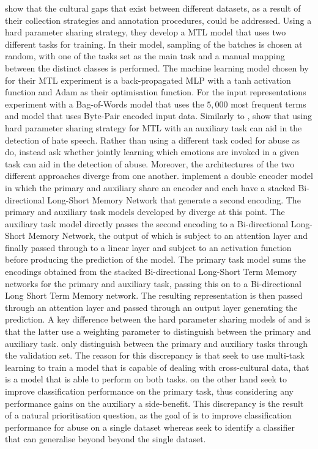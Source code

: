 \citet{Waseem:2018} show that the cultural gaps that exist between different datasets, as a result of their collection strategies and annotation procedures, could be addressed.
Using a hard parameter sharing strategy, they develop a MTL model that uses two different tasks for training.
In their model, sampling of the batches is chosen at random, with one of the tasks set as the main task and a manual mapping between the distinct classes is performed.
The machine learning model chosen by \citet{Waseem:2018} for their MTL experiment is a back-propagated MLP with a tanh activation function and Adam as their optimisation function.
For the input representations \citet{Waseem:2018} experiment with a Bag-of-Words model that uses the $5,000$ most frequent terms and model that uses Byte-Pair encoded input data.
Similarly to \citet{Waseem:2018}, \citet{Rajamanickam:2020} show that using hard parameter sharing strategy for MTL with an auxiliary task can aid in the detection of hate speech.
Rather than using a different task coded for abuse as \citet{Waseem:2018} do, \citet{Rajamanickam:2020} instead ask whether jointly learning which emotions are invoked in a given task can aid in the detection of abuse.
Moreover, the architectures of the two different approaches diverge from one another.
\citet{Rajamanickam:2020} implement a double encoder model in which the primary and auxiliary share an encoder and each have a stacked Bi-directional Long-Short Memory Network that generate a second encoding.
The primary and auxiliary task models developed by \citet{Rajamanickam:2020} diverge at this point. The auxiliary task model directly passes the second encoding to a Bi-directional Long-Short Memory Network, the output of which is subject to an attention layer and finally passed through to a linear layer and subject to an activation function before producing the prediction of the model.
The primary task model sums the encodings obtained from the stacked Bi-directional Long-Short Term Memory networks for the primary and auxiliary task, passing this on to a Bi-directional Long Short Term Memory network.
The resulting representation is then passed through an attention layer and passed through an output layer generating the prediction.
A key difference between the hard parameter sharing models of \citet{Waseem:2018} and \citet{Rajamanickam:2020} is that the latter use a weighting parameter to distinguish between the primary and auxiliary task.
\citet{Waseem:2018} only distinguish between the primary and auxiliary tasks through the validation set.
The reason for this discrepancy is that \citet{Waseem:2018} seek to use multi-task learning to train a model that is capable of dealing with cross-cultural data, that is a model that is able to perform on both tasks. 
\citet{Rajamanickam:2020} on the other hand seek to improve classification performance on the primary task, thus considering any performance gains on the auxiliary a side-benefit.
This discrepancy is the result of a natural prioritisation question, as the goal of \citet{Rajamanickam:2020} is to improve classification performance for abuse on a single dataset whereas \citet{Waseem:2018} seek to identify a classifier that can generalise beyond beyond the single dataset.

